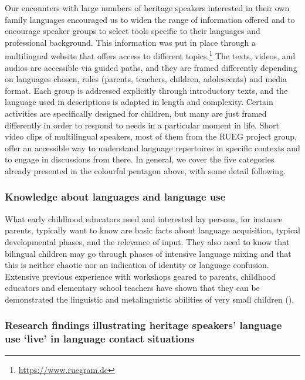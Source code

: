 \documentclass[output=paper,colorlinks,citecolor=brown]{langscibook}
\begin{document}
Our encounters with large numbers of heritage speakers interested in their own family languages encouraged us to widen the range of information offered and to encourage speaker groups to select tools specific to their languages and professional background. This information was put in place through a multilingual website that offers access to different topics.\footnote{\url{https://www.ruegram.de}} The texts, videos, and audios are accessible via guided paths, and they are framed differently depending on languages chosen, roles (parents, teachers, children, adolescents) and media format. Each group is addressed explicitly through introductory texts, and the language used in descriptions is adapted in length and complexity. Certain activities are specifically designed for children, but many are just framed differently in order to respond to needs in a particular moment in life. Short video clips of multilingual speakers, most of them from the RUEG project group, offer an accessible way to understand language repertoires in specific contexts and to engage in discussions from there. In general, we cover the five categories already presented in the colourful pentagon above, with some detail following.

\subsubsection{Knowledge about languages and language use}

What early childhood educators need and interested lay persons, for instance parents, typically want to know are basic facts about language acquisition, typical developmental phases, and the relevance of input. They also need to know that bilingual children may go through phases of intensive language mixing and that this is neither chaotic nor an indication of identity or language confusion. Extensive previous experience with workshops geared to parents, childhood educators and elementary school teachers have shown that they can be demonstrated the linguistic and metalinguistic abilities of very small children (\citealt{Tracy2008, VoetCornelli&al.2013}).

\subsubsection{Research findings illustrating heritage speakers’ language use ‘live’ in language contact situations}
\end{document}
